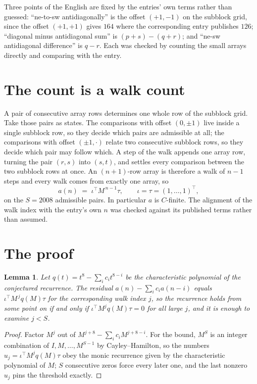 \documentclass[11pt,a4paper]{article}
\theoremstyle{plain}
\newtheorem{lemma}[theorem]{Lemma}
\theoremstyle{definition}
\begin{document}
Three points of the English are fixed by the entries' own terms rather than guessed:
``ne-to-sw antidiagonally'' is the offset $(+1,-1)$ on the subblock grid, since the offset
$(+1,+1)$ gives $164$ where the corresponding entry publishes $126$; ``diagonal minus
antidiagonal sum'' is $(p+s)-(q+r)$; and ``ne-sw antidiagonal difference'' is $q-r$. Each was
checked by counting the small arrays directly and comparing with the entry.

\section{The count is a walk count}

A pair of consecutive array rows determines one whole row of the subblock grid. Take those
pairs as states. The comparisons with offset $(0,\pm1)$ live inside a single subblock row, so
they decide which pairs are admissible at all; the comparisons with offset $(\pm1,\cdot)$
relate two consecutive subblock rows, so they decide which pair may follow which. A step of the
walk appends one array row, turning the pair $(r,s)$ into $(s,t)$, and settles every comparison
between the two subblock rows at once. An $(n+1)$-row array is therefore a walk of $n-1$ steps
and every walk comes from exactly one array, so
\[
a(n)\;=\;\iota^{\!\top}M^{\,n-1}\tau,\qquad \iota=\tau=(1,\dots,1)^{\!\top},
\]
on the $S=2008$ admissible pairs. In particular $a$ is $C$-finite. The alignment of the walk
index with the entry's own $n$ was checked against its published terms rather than assumed.

\section{The proof}

\begin{lemma}\label{lem:crit}
Let $q(t)=t^{8}-\sum_i c_it^{8-i}$ be the characteristic polynomial of the
conjectured recurrence. The residual $a(n)-\sum_ic_ia(n-i)$ equals
$\iota^{\!\top}M^{\,j}q(M)\tau$ for the corresponding walk index $j$, so the recurrence
holds from some point on if and only if $\iota^{\!\top}M^{j}q(M)\tau=0$ for all large $j$,
and it is enough to examine $j<S$.
\end{lemma}

\begin{proof}
Factor $M^{j}$ out of $M^{j+8}-\sum_ic_iM^{j+8-i}$. For the bound, $M^{S}$
is an integer combination of $I,M,\dots,M^{S-1}$ by Cayley--Hamilton, so the numbers
$u_j=\iota^{\!\top}M^{j}q(M)\tau$ obey the monic recurrence given by the characteristic
polynomial of $M$; $S$ consecutive zeros force every later one, and the last nonzero $u_j$
pins the threshold exactly.
\end{proof}
\end{document}
